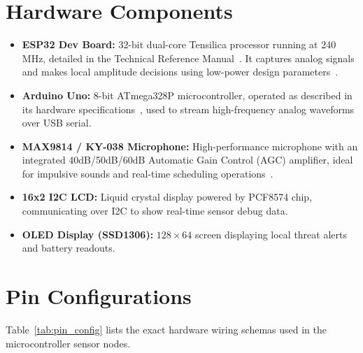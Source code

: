 \documentclass[11pt,a4paper,oneside]{report}
\begin{document}
\section{Hardware Components}
\begin{itemize}
    \item \textbf{ESP32 Dev Board:} 32-bit dual-core Tensilica processor running at 240\,MHz, detailed in the Technical Reference Manual~\cite{ref_espressif}. It captures analog signals and makes local amplitude decisions using low-power design parameters~\cite{ref_aravindan}.
    \item \textbf{Arduino Uno:} 8-bit ATmega328P microcontroller, operated as described in its hardware specifications~\cite{ref_arduino}, used to stream high-frequency analog waveforms over USB serial.
    \item \textbf{MAX9814 / KY-038 Microphone:} High-performance microphone with an integrated 40dB/50dB/60dB Automatic Gain Control (AGC) amplifier, ideal for impulsive sounds and real-time scheduling operations~\cite{ref_swamy}.
    \item \textbf{16x2 I2C LCD:} Liquid crystal display powered by PCF8574 chip, communicating over I2C to show real-time sensor debug data.
    \item \textbf{OLED Display (SSD1306):} $128 \times 64$ screen displaying local threat alerts and battery readouts.
\end{itemize}

\section{Pin Configurations}
Table~\ref{tab:pin_config} lists the exact hardware wiring schemas used in the microcontroller sensor nodes.
\end{document}
